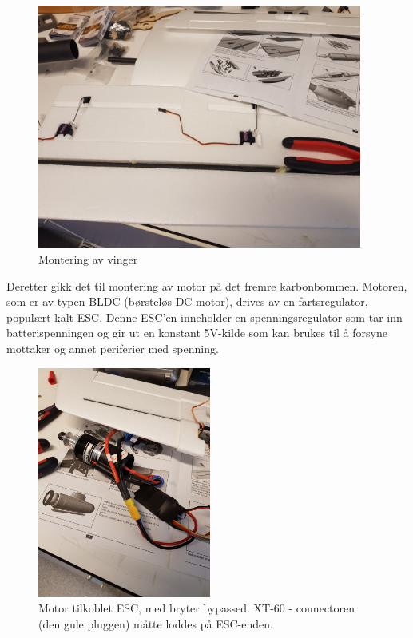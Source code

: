 \documentclass[12pt, a4paper]{article}
\begin{document}
\begin{figure}[ht]
	\centering
	\includegraphics[width=.6\textwidth,  height = 8cm]{bilder/vingemontering.jpg}
	\caption{Montering av vinger}
\end{figure}

\newpage
Deretter gikk det til montering av motor på det fremre karbonbommen. Motoren, som er av typen BLDC (børsteløs DC-motor), drives av en fartsregulator, populært kalt ESC. Denne ESC'en inneholder en spenningsregulator som tar inn batterispenningen og gir ut en konstant 5V-kilde som kan brukes til å forsyne mottaker og annet periferier med spenning. 

\begin{figure}[ht]
	\centering
	\includegraphics[height=7.6cm, width = .55\textwidth]{bilder/esc_og_motor.jpg}
	\caption[Observer-motor]{Motor tilkoblet ESC, med bryter bypassed. XT-60 - connectoren (den gule pluggen) måtte loddes på ESC-enden.}
\end{figure}
\end{document}
